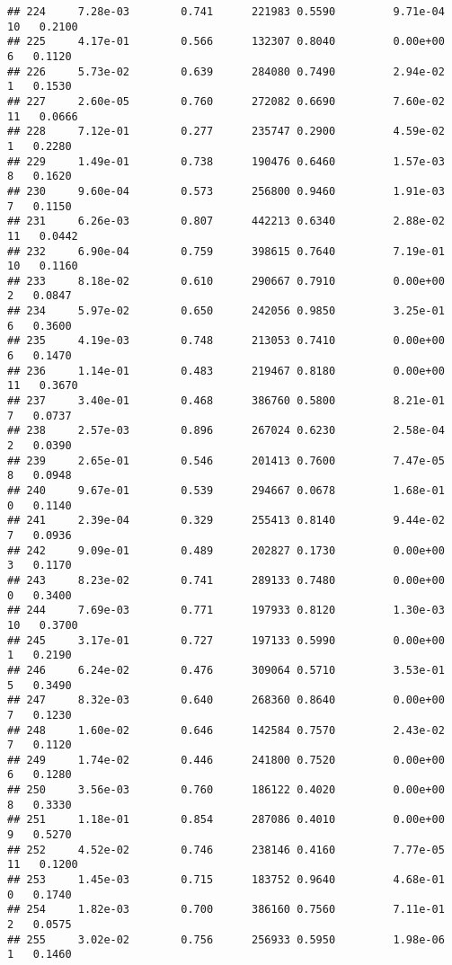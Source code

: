 \documentclass[
]{article}
\begin{document}
\begin{verbatim}
## 224     7.28e-03        0.741      221983 0.5590         9.71e-04  10   0.2100
## 225     4.17e-01        0.566      132307 0.8040         0.00e+00   6   0.1120
## 226     5.73e-02        0.639      284080 0.7490         2.94e-02   1   0.1530
## 227     2.60e-05        0.760      272082 0.6690         7.60e-02  11   0.0666
## 228     7.12e-01        0.277      235747 0.2900         4.59e-02   1   0.2280
## 229     1.49e-01        0.738      190476 0.6460         1.57e-03   8   0.1620
## 230     9.60e-04        0.573      256800 0.9460         1.91e-03   7   0.1150
## 231     6.26e-03        0.807      442213 0.6340         2.88e-02  11   0.0442
## 232     6.90e-04        0.759      398615 0.7640         7.19e-01  10   0.1160
## 233     8.18e-02        0.610      290667 0.7910         0.00e+00   2   0.0847
## 234     5.97e-02        0.650      242056 0.9850         3.25e-01   6   0.3600
## 235     4.19e-03        0.748      213053 0.7410         0.00e+00   6   0.1470
## 236     1.14e-01        0.483      219467 0.8180         0.00e+00  11   0.3670
## 237     3.40e-01        0.468      386760 0.5800         8.21e-01   7   0.0737
## 238     2.57e-03        0.896      267024 0.6230         2.58e-04   2   0.0390
## 239     2.65e-01        0.546      201413 0.7600         7.47e-05   8   0.0948
## 240     9.67e-01        0.539      294667 0.0678         1.68e-01   0   0.1140
## 241     2.39e-04        0.329      255413 0.8140         9.44e-02   7   0.0936
## 242     9.09e-01        0.489      202827 0.1730         0.00e+00   3   0.1170
## 243     8.23e-02        0.741      289133 0.7480         0.00e+00   0   0.3400
## 244     7.69e-03        0.771      197933 0.8120         1.30e-03  10   0.3700
## 245     3.17e-01        0.727      197133 0.5990         0.00e+00   1   0.2190
## 246     6.24e-02        0.476      309064 0.5710         3.53e-01   5   0.3490
## 247     8.32e-03        0.640      268360 0.8640         0.00e+00   7   0.1230
## 248     1.60e-02        0.646      142584 0.7570         2.43e-02   7   0.1120
## 249     1.74e-02        0.446      241800 0.7520         0.00e+00   6   0.1280
## 250     3.56e-03        0.760      186122 0.4020         0.00e+00   8   0.3330
## 251     1.18e-01        0.854      287086 0.4010         0.00e+00   9   0.5270
## 252     4.52e-02        0.746      238146 0.4160         7.77e-05  11   0.1200
## 253     1.45e-03        0.715      183752 0.9640         4.68e-01   0   0.1740
## 254     1.82e-03        0.700      386160 0.7560         7.11e-01   2   0.0575
## 255     3.02e-02        0.756      256933 0.5950         1.98e-06   1   0.1460

\end{verbatim}
\end{document}
